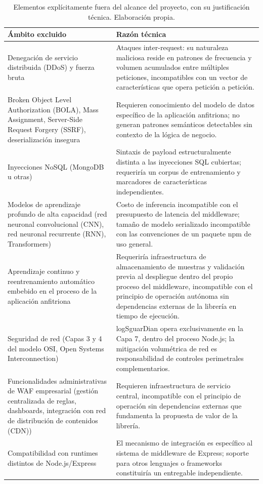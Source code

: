 \begin{table}[ht]
\small
\begin{tabular}{|p{3.6cm}|p{9.4cm}|}
\hline
\textbf{Ámbito excluido} & \textbf{Razón técnica} \\ \hline
Denegación de servicio distribuida (DDoS) y fuerza bruta & Ataques inter-request: su naturaleza maliciosa reside en patrones de frecuencia y volumen acumulados entre múltiples peticiones, incompatibles con un vector de características que opera petición a petición. \\ \hline
Broken Object Level Authorization (BOLA), Mass Assignment, Server-Side Request Forgery (SSRF), deserialización insegura & Requieren conocimiento del modelo de datos específico de la aplicación anfitriona; no generan patrones semánticos detectables sin contexto de la lógica de negocio. \\ \hline
Inyecciones NoSQL (MongoDB u otras) & Sintaxis de payload estructuralmente distinta a las inyecciones SQL cubiertas; requeriría un corpus de entrenamiento y marcadores de características independientes. \\ \hline
Modelos de aprendizaje profundo de alta capacidad (red neuronal convolucional (CNN), red neuronal recurrente (RNN), Transformers) & Costo de inferencia incompatible con el presupuesto de latencia del middleware; tamaño de modelo serializado incompatible con las convenciones de un paquete npm de uso general. \\ \hline
Aprendizaje continuo y reentrenamiento automático embebido en el proceso de la aplicación anfitriona & Requeriría infraestructura de almacenamiento de muestras y validación previa al despliegue dentro del propio proceso del middleware, incompatible con el principio de operación autónoma sin dependencias externas de la librería en tiempo de ejecución. \\ \hline
Seguridad de red (Capas 3 y 4 del modelo OSI, Open Systems Interconnection) & logSguarDian opera exclusivamente en la Capa 7, dentro del proceso Node.js; la mitigación volumétrica de red es responsabilidad de controles perimetrales complementarios. \\ \hline
Funcionalidades administrativas de WAF empresarial (gestión centralizada de reglas, dashboards, integración con red de distribución de contenidos (CDN)) & Requieren infraestructura de servicio central, incompatible con el principio de operación sin dependencias externas que fundamenta la propuesta de valor de la librería. \\ \hline
Compatibilidad con runtimes distintos de Node.js/Express & El mecanismo de integración es específico al sistema de middleware de Express; soporte para otros lenguajes o frameworks constituiría un entregable independiente. \\ \hline
\end{tabular}
\caption[Elementos fuera del alcance del proyecto]{Elementos explícitamente fuera del alcance del proyecto, con su justificación técnica. Elaboración propia.}
\label{cuadro:fuera_alcance}
\end{table}

